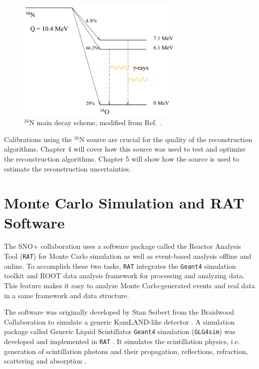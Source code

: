 \begin{figure}[!htb]
	\centering
	\includegraphics[width=8cm]{n16_decay.png}
	\caption[$^{16}$N main decay scheme.]{$^{16}$N main decay scheme, modified from Ref.~\cite{dragowsky200216n}.}
	\label{n16decay}
\end{figure}

Calibrations using the $^{16}$N source are crucial for the quality of the reconstruction algorithms. Chapter 4 will cover how this source was used to test and optimize the reconstruction algorithms. Chapter 5 will show how the source is used to estimate the reconstruction uncertainties.

\section{Monte Carlo Simulation and RAT Software}\label{sect:rat}

The SNO+ collaboration uses a software package called the Reactor Analysis Tool (\texttt{RAT}) for Monte Carlo simulation as well as event-based analysis offline and online. To accomplish these two tasks, \texttt{RAT} integrates the \texttt{Geant4} simulation toolkit \cite{agostinelli2003geant4} and ROOT data analysis framework \cite{brunroot} for processing and analyzing data. This feature makes it easy to analyze Monte Carlo-generated events and real data in a same framework and data structure.

The software was originally developed by Stan Seibert from the Braidwood Collaboration to simulate a generic KamLAND-like detector \cite{ratManual}. A simulation package called Generic Liquid Scintillator \texttt{Geant4} simulation (\texttt{GLG4sim}) was developed and implemented in \texttt{RAT} \cite{horton2006introduction}. It simulates the scintillation physics, i.e. generation of scintillation photons and their propagation, reflections, refraction, scattering and absorption \cite{dunger2018topological}.

